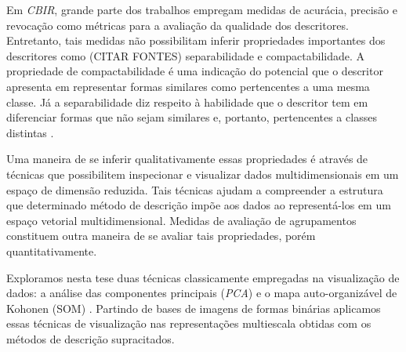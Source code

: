Em \emph{CBIR}, grande parte dos trabalhos empregam medidas de acurácia, precisão e revocação como métricas para a avaliação da qualidade dos descritores. Entretanto, tais medidas não possibilitam inferir propriedades importantes dos descritores como \color{red}(CITAR FONTES) separabilidade e compactabilidade. A propriedade de compactabilidade é uma indicação do potencial que o descritor apresenta em representar formas similares como pertencentes a uma mesma classe. Já a separabilidade diz respeito à habilidade que o descritor tem em diferenciar formas que não sejam similares e, portanto, pertencentes a classes distintas \color{black}. 

Uma maneira de se inferir qualitativamente essas propriedades é através de técnicas que possibilitem inspecionar e visualizar dados multidimensionais em um espaço de dimensão reduzida. Tais técnicas ajudam a compreender a estrutura que determinado método de descrição impõe aos dados ao representá-los em um espaço vetorial multidimensional. Medidas de avaliação de agrupamentos constituem outra maneira de se avaliar tais propriedades, porém quantitativamente. 

Exploramos nesta tese duas técnicas classicamente empregadas na visualização de dados: a análise das componentes principais (\emph{PCA}) e o mapa auto-organizável de Kohonen (SOM) \cite{Kohonen:1982}. Partindo de bases de imagens de formas binárias aplicamos essas técnicas de visualização nas representações multiescala obtidas com os métodos de descrição supracitados.   
 



